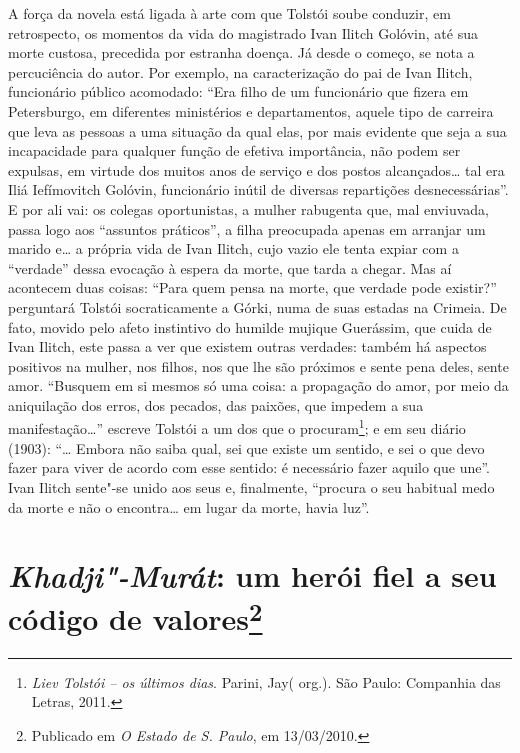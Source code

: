 A força da novela está ligada à arte com que
Tolstói soube conduzir, em retrospecto, os momentos da vida do
magistrado Ivan Ilitch Golóvin, até sua morte custosa, precedida por
estranha doença. Já desde o começo, se nota a percuciência do autor. Por
exemplo, na caracterização do pai de Ivan Ilitch, funcionário público
acomodado: ``Era filho de um funcionário que fizera em Petersburgo, em
diferentes ministérios e departamentos, aquele tipo de carreira que leva
as pessoas a uma situação da qual elas, por mais evidente que seja a sua
incapacidade para qualquer função de efetiva importância, não podem ser
expulsas, em virtude dos muitos anos de serviço e dos postos
alcançados\ldots{} tal era Iliá Iefímovitch Golóvin, funcionário inútil de
diversas repartições desnecessárias''. E por ali vai: os colegas
oportunistas, a mulher rabugenta que, mal enviuvada, passa logo aos ``assuntos práticos'', a filha preocupada apenas em arranjar um marido
e\ldots{} a própria vida de Ivan Ilitch, cujo vazio ele tenta expiar com a ``verdade'' dessa evocação à espera da morte, que tarda a chegar. Mas aí
acontecem duas coisas: ``Para quem pensa na morte, que verdade pode
existir?'' perguntará Tolstói socraticamente a Górki, numa de suas
estadas na Crimeia. De fato, movido pelo afeto instintivo do humilde
mujique Guerássim, que cuida de Ivan Ilitch, este passa a ver que
existem outras verdades: também há aspectos positivos na mulher, nos
filhos, nos que lhe são próximos e sente pena deles, sente amor.
``Busquem em si mesmos só uma coisa: a propagação do amor, por meio da
aniquilação dos erros, dos pecados, das paixões, que impedem a sua
manifestação\ldots{}'' escreve Tolstói a um dos que o procuram\footnote{\emph{Liev
Tolstói -- os últimos dias}. Parini, Jay( org.). São Paulo: Companhia das Letras, 2011.}; e em seu diário (1903): ``\ldots{} Embora não saiba qual, sei que existe um sentido, e sei o que devo
fazer para viver de acordo com esse sentido: é necessário fazer aquilo
que une''. Ivan Ilitch sente"-se unido aos seus e, finalmente, ``procura
o seu habitual medo da morte e não o encontra\ldots{} em lugar da morte,
havia luz''.

\chapter{\emph{Khadji"-Murát}: um herói fiel a seu código de
valores\footnote{Publicado em \emph{O Estado de S. Paulo}, em
  13/03/2010.}}

